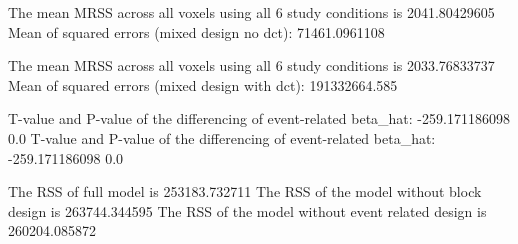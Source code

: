 The mean MRSS across all voxels using all 6 study conditions is 2041.80429605
Mean of squared errors (mixed design no dct):  71461.0961108


The mean MRSS across all voxels using all 6 study conditions is 2033.76833737
Mean of squared errors (mixed design with dct):  191332664.585

T-value and P-value of the differencing of event-related beta_hat:  -259.171186098 0.0
T-value and P-value of the differencing of event-related beta_hat:  -259.171186098 0.0

The RSS of full model is 253183.732711
The RSS of the model without block design is 263744.344595
The RSS of the model without event related design is 260204.085872

